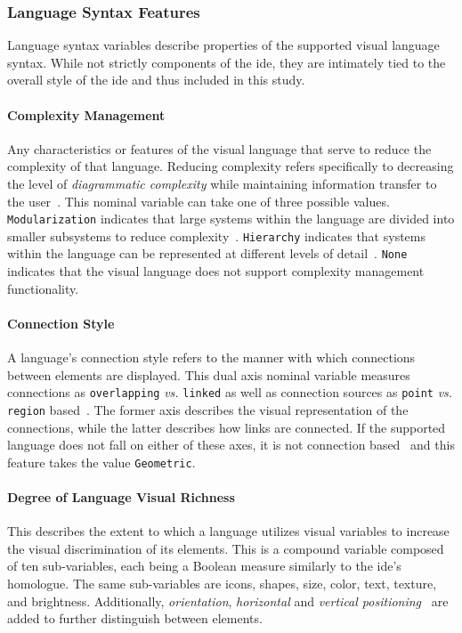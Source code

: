 \subsubsection{Language Syntax Features} \label{subsubsec:languagesyntax}

Language syntax variables describe properties of the supported visual
language syntax. While not strictly components of the \ac{ide}, they are
intimately tied to the overall style of the \ac{ide} and thus included in this
study.


\paragraph{Complexity Management}
Any characteristics or features of the
visual language that serve to reduce the complexity of that language.
Reducing complexity refers specifically to decreasing the level of
\emph{diagrammatic complexity} while maintaining information transfer to
the user~\cite{moody2009}.
This nominal variable can take one of three
possible values. \texttt{Modularization} indicates that large systems
within the language are divided into smaller subsystems to reduce
complexity~\cite{moody2009}. \texttt{Hierarchy} indicates that systems
within the language can be represented at different levels of detail~\cite{moody2009}.
\texttt{None} indicates that the visual language does not
support complexity management functionality.


\paragraph{Connection Style}
A language's connection style refers to the
manner with which connections between elements are displayed. This dual
axis nominal variable measures connections as \texttt{overlapping}
\emph{vs.} \texttt{linked} as well as connection sources as \texttt{point}
\emph{vs.} \texttt{region} based~\cite{costagliola2002}. The former axis
describes the visual representation of the connections, while the latter
describes how links are connected.
If the supported language does not fall
on either of these axes, it is not connection based~\cite{costagliola2002}
and this feature takes the value \texttt{Geometric}.


\paragraph{Degree of Language Visual Richness}
This describes the extent to which a language utilizes visual variables to increase the visual discrimination of its elements.
This is a compound variable composed of ten sub-variables, each being a Boolean measure similarly to the \ac{ide}'s homologue.
The same sub-variables are icons, shapes, size, color, text, texture, and brightness.
Additionally, \emph{orientation}, \emph{horizontal} and \emph{vertical positioning}~\cite{moody2009} are added to further distinguish between elements.


